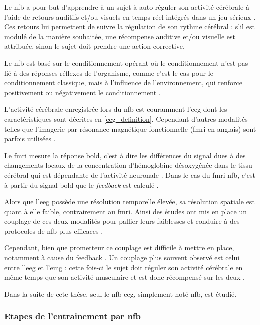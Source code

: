 Le \gls{nfb} a pour but d'apprendre à un sujet à auto-réguler son activité cérébrale à l'aide de retours auditifs et/ou visuels en temps réel
intégrés dans un jeu sérieux \citep{Wang2010}. Ces retours lui permettent de suivre la régulation de son rythme cérébral : s'il est modulé de 
la manière souhaitée, une récompense auditive et/ou visuelle est attribuée, sinon le sujet doit prendre une action corrective. 

Le \gls{nfb} est basé sur le conditionnement opérant \citep{Reynolds1975} où le conditionnement n'est pas lié à 
des réponses réflexes de l'organisme, comme c'est le cas pour le conditionnement classique, mais à l'influence de l'environnement, qui 
renforce positivement ou négativement le conditionnement \citep{Skinner1948}. 

L'activité cérébrale enregistrée lors du \gls{nfb} est couramment l'\gls{eeg} dont les caractéristiques sont décrites en \ref{eeg_definition}.
Cependant d'autres modalités telles que l'imagerie par résonance magnétique fonctionnelle (\gls{fmri} en anglais) sont parfois utilisées \citep{Sulzer2013}. 

Le \gls{fmri} mesure la réponse \gls{bold}, c'est à dire les différences du signal dues à des changements locaux de la concentration d'hémoglobine désoxygénée 
dans le tissu cérébral qui est dépendante de l'activité neuronale \citep{Dewiputri2013}. Dans le cas du \gls{fmri}-\gls{nfb}, c'est à partir du signal 
\gls{bold} que le \textit{feedback} est calculé \citep{Dewiputri2013}. 

Alors que l'\gls{eeg} possède une résolution temporelle élevée, sa résolution spatiale est quant à elle faible, 
contrairement au \gls{fmri}. Ainsi des études ont mis en place un couplage de ces deux modalités pour pallier leurs faiblesses et conduire à des 
protocoles de \gls{nfb} plus efficaces \citep{Perronnet2017}. 

Cependant, bien que prometteur ce couplage est difficile à mettre en place, notamment à cause du feedback .
Un couplage plus souvent observé est celui entre l'\gls{eeg} et l'\gls{emg} : cette fois-ci le sujet doit réguler son activité cérébrale en même temps que son
activité musculaire et est donc récompensé sur les deux \citep{Bink2014}.

Dans la suite de cete thèse, seul le \gls{nfb}-\gls{eeg}, simplement noté \gls{nfb}, est étudié. 

\subsubsection{Etapes de l'entrainement par \gls{nfb}}

